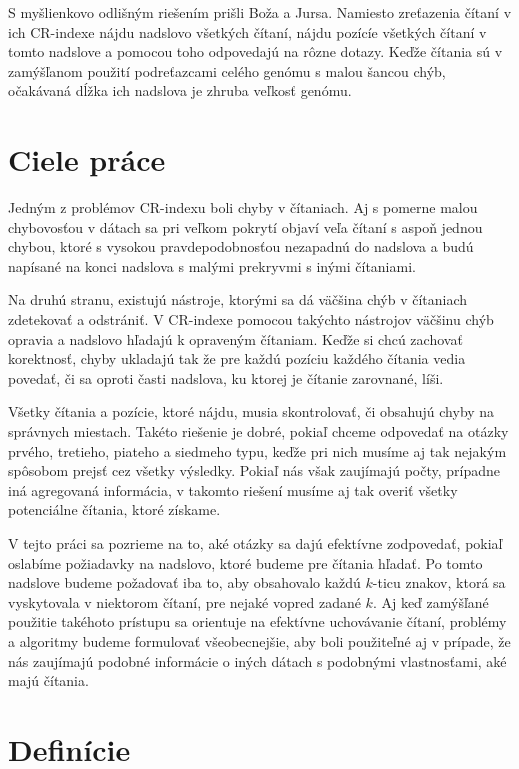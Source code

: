 S myšlienkovo odlišným riešením prišli Boža a Jursa. Namiesto zreťazenia čítaní v
ich CR-indexe \cite{cr_index} nájdu nadslovo všetkých čítaní, nájdu pozícíe všetkých
čítaní v tomto nadslove a pomocou toho odpovedajú na rôzne dotazy. Keďže čítania sú v zamýšľanom použití podreťazcami celého
genómu s malou šancou chýb, očakávaná dĺžka ich nadslova je zhruba veľkosť genómu.

\section{Ciele práce}

Jedným z problémov CR-indexu boli chyby v čítaniach. Aj s pomerne malou chybovosťou
v dátach sa pri veľkom pokrytí objaví veľa čítaní s aspoň jednou chybou, ktoré s vysokou
pravdepodobnosťou nezapadnú do nadslova a budú napísané na konci nadslova s malými
prekryvmi s inými čítaniami.

Na druhú stranu, existujú nástroje, ktorými sa dá väčšina chýb v čítaniach zdetekovať
a odstrániť. V CR-indexe pomocou takýchto nástrojov väčšinu chýb opravia a nadslovo
hľadajú k opraveným čítaniam. Keďže si chcú zachovať korektnosť, chyby ukladajú tak
že pre každú pozíciu každého čítania vedia povedať, či sa oproti časti nadslova,
ku ktorej je čítanie zarovnané, líši.

Všetky čítania a pozície, ktoré nájdu, musia skontrolovať, či obsahujú chyby na správnych miestach.
Takéto riešenie je dobré, pokiaľ chceme odpovedať na otázky prvého, tretieho, piateho a
siedmeho typu, keďže pri nich musíme aj tak nejakým spôsobom prejsť cez všetky výsledky.
Pokiaľ nás však zaujímajú počty, prípadne iná agregovaná informácia, v takomto riešení
musíme aj tak overiť všetky potenciálne čítania, ktoré získame.

V tejto práci sa pozrieme na to, aké otázky sa dajú efektívne zodpovedať, pokiaľ
oslabíme požiadavky na nadslovo, ktoré budeme pre čítania hľadať. Po tomto nadslove
budeme požadovať iba to, aby obsahovalo každú $k$-ticu znakov, ktorá sa vyskytovala
v niektorom čítaní, pre nejaké vopred zadané $k$. Aj keď zamýšľané použitie takéhoto
prístupu sa orientuje na efektívne uchovávanie čítaní, problémy a algoritmy budeme
formulovať všeobecnejšie, aby boli použiteľné aj v prípade, že nás zaujímajú podobné
informácie o iných dátach s podobnými vlastnosťami, aké majú čítania.

\section{Definície}

